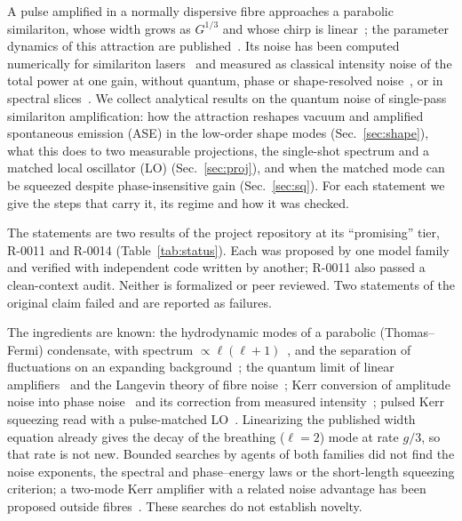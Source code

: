 \documentclass[aps,pra,twocolumn,superscriptaddress,nofootinbib,floatfix]{revtex4-2}
\begin{document}
A pulse amplified in a normally dispersive fibre approaches a parabolic similariton, whose width grows as $G^{1/3}$
and whose chirp is linear~\cite{fermann2000,kruglov2002,finot2004}; the parameter dynamics of this attraction are
published~\cite{wabnitz2007,wabnitz2007qels}. Its noise has been computed numerically for similariton
lasers~\cite{zweck2018} and measured as classical intensity noise of the total power at one gain, without quantum, phase
or shape-resolved noise~\cite{wang2016spie,wang2016ol}, or in spectral slices~\cite{haviv2026}. We collect analytical results on the quantum noise of single-pass similariton
amplification: how the attraction reshapes vacuum and amplified spontaneous emission (ASE) in the low-order shape modes
(Sec.~\ref{sec:shape}), what this does to two measurable projections, the single-shot spectrum and a matched local
oscillator (LO) (Sec.~\ref{sec:proj}), and when the matched mode can be squeezed despite phase-insensitive gain
(Sec.~\ref{sec:sq}). For each statement we give the steps that carry it, its regime and how it was checked.

The statements are two results of the project repository at its ``promising'' tier, R-0011 and R-0014
(Table~\ref{tab:status}). Each was proposed by one model family and verified with independent code written by
another; R-0011 also passed a clean-context audit. Neither is formalized or peer reviewed. Two statements of the
original claim failed and are reported as failures.

The ingredients are known: the hydrodynamic modes of a parabolic (Thomas--Fermi) condensate, with spectrum
$\propto\ell(\ell+1)$~\cite{menotti2002}, and the separation of fluctuations on an expanding background~\cite{fedichev2004};
the quantum limit of linear amplifiers~\cite{caves1982} and the Langevin theory of fibre noise~\cite{drummond2001}; Kerr
conversion of amplitude noise into phase noise~\cite{gordon1990} and its correction from measured
intensity~\cite{ho2004}; pulsed Kerr squeezing read with a pulse-matched LO~\cite{shirasaki1990,doerr1994}. Linearizing
the published width equation already gives the decay of the breathing ($\ell=2$) mode at rate $g/3$, so that rate is not
new. Bounded searches by agents of both families did not find the noise exponents, the spectral and phase--energy laws or the
short-length squeezing criterion; a two-mode Kerr amplifier with a related noise advantage has been proposed outside
fibres~\cite{ren2026}. These searches do not establish novelty.

\end{document}
